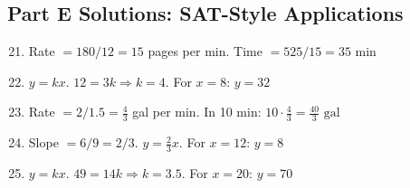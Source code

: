 \documentclass[12pt]{article}
\begin{document}
\subsection*{Part E Solutions: SAT-Style Applications}
\begin{enumerate}
  \setcounter{enumi}{20}
  \item Rate \(=180/12=15\) pages per min. Time \(=525/15=\boxed{35\text{ min}}\)
  \item \(y=kx\). \(12=3k \Rightarrow k=4\). For \(x=8\): \(\boxed{y=32}\)
  \item Rate \(=2/1.5=\tfrac{4}{3}\) gal per min. In 10 min: \(10\cdot\tfrac{4}{3}=\boxed{\tfrac{40}{3}\text{ gal}}\)
  \item Slope \(=6/9=2/3\). \(\boxed{y=\tfrac{2}{3}x}\). For \(x=12\): \(\boxed{y=8}\)
  \item \(y=kx\). \(49=14k \Rightarrow k=3.5\). For \(x=20\): \(\boxed{y=70}\)
\end{enumerate}
\end{document}
